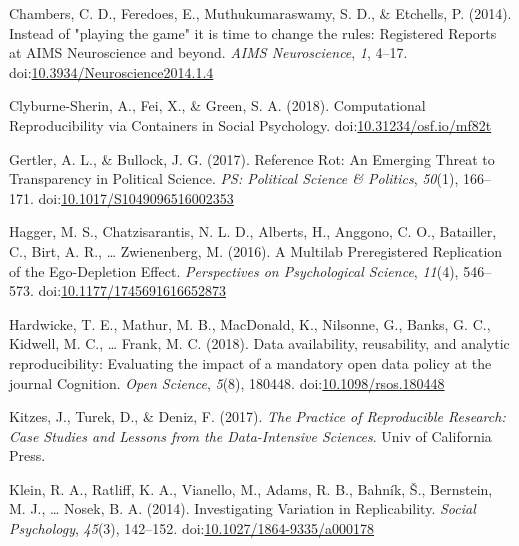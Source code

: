 \documentclass[,jou, a4paper,floatsintext]{apa6}
\begin{document}
\leavevmode\hypertarget{ref-chambers_instead_2014}{}%
Chambers, C. D., Feredoes, E., Muthukumaraswamy, S. D., \& Etchells, P. (2014). Instead of "playing the game" it is time to change the rules: Registered Reports at AIMS Neuroscience and beyond. \emph{AIMS Neuroscience}, \emph{1}, 4--17. doi:\href{https://doi.org/10.3934/Neuroscience2014.1.4}{10.3934/Neuroscience2014.1.4}

\leavevmode\hypertarget{ref-clyburne-sherin_computational_2018}{}%
Clyburne-Sherin, A., Fei, X., \& Green, S. A. (2018). Computational Reproducibility via Containers in Social Psychology. doi:\href{https://doi.org/10.31234/osf.io/mf82t}{10.31234/osf.io/mf82t}

\leavevmode\hypertarget{ref-gertler_reference_2017}{}%
Gertler, A. L., \& Bullock, J. G. (2017). Reference Rot: An Emerging Threat to Transparency in Political Science. \emph{PS: Political Science \& Politics}, \emph{50}(1), 166--171. doi:\href{https://doi.org/10.1017/S1049096516002353}{10.1017/S1049096516002353}

\leavevmode\hypertarget{ref-hagger_multilab_2016}{}%
Hagger, M. S., Chatzisarantis, N. L. D., Alberts, H., Anggono, C. O., Batailler, C., Birt, A. R., \ldots{} Zwienenberg, M. (2016). A Multilab Preregistered Replication of the Ego-Depletion Effect. \emph{Perspectives on Psychological Science}, \emph{11}(4), 546--573. doi:\href{https://doi.org/10.1177/1745691616652873}{10.1177/1745691616652873}

\leavevmode\hypertarget{ref-hardwicke_data_2018}{}%
Hardwicke, T. E., Mathur, M. B., MacDonald, K., Nilsonne, G., Banks, G. C., Kidwell, M. C., \ldots{} Frank, M. C. (2018). Data availability, reusability, and analytic reproducibility: Evaluating the impact of a mandatory open data policy at the journal Cognition. \emph{Open Science}, \emph{5}(8), 180448. doi:\href{https://doi.org/10.1098/rsos.180448}{10.1098/rsos.180448}

\leavevmode\hypertarget{ref-kitzes_practice_2017}{}%
Kitzes, J., Turek, D., \& Deniz, F. (2017). \emph{The Practice of Reproducible Research: Case Studies and Lessons from the Data-Intensive Sciences}. Univ of California Press.

\leavevmode\hypertarget{ref-klein_investigating_2014}{}%
Klein, R. A., Ratliff, K. A., Vianello, M., Adams, R. B., Bahník, Š., Bernstein, M. J., \ldots{} Nosek, B. A. (2014). Investigating Variation in Replicability. \emph{Social Psychology}, \emph{45}(3), 142--152. doi:\href{https://doi.org/10.1027/1864-9335/a000178}{10.1027/1864-9335/a000178}
\end{document}

